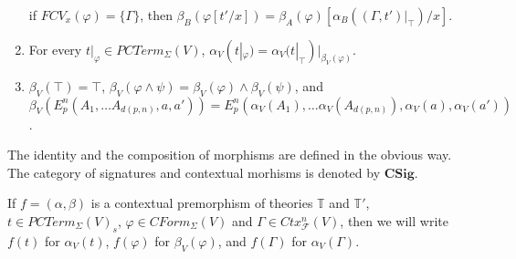 \documentclass[reqno]{amsart}
\theoremstyle{definition}
\theoremstyle{remark}
\newcommand{\cat}[1]{\mathbf{#1}}
\newcommand{\CSig}{\cat{CSig}}
\numberwithin{figure}{section}
\begin{document}
\begin{defn}
\begin{enumerate}
    if $FCV_x(\varphi) = \{ \Gamma \}$, then $\beta_B(\varphi[t'/x]) = \beta_A(\varphi)[\alpha_B((\Gamma,t')|_\top)/x]$.
\label{con-mor-b-subst}
\item For every $t|_\varphi \in PCTerm_\Sigma(V)$, $\alpha_V(t|_\varphi) = \alpha_V(t|_\top)|_{\beta_V(\varphi)}$.
\label{con-mor-a-op}
\item $\beta_V(\top) = \top$, $\beta_V(\varphi \land \psi) = \beta_V(\varphi) \land \beta_V(\psi)$,
    and $\beta_V(E^n_p(A_1, \ldots A_{d(p,n)}, a, a')) = E^n_p(\alpha_V(A_1), \ldots \alpha_V(A_{d(p,n)}), \alpha_V(a), \alpha_V(a'))$.
\label{con-mor-b-op}
\end{enumerate}
The identity and the composition of morphisms are defined in the obvious way.
The category of signatures and contextual morhisms is denoted by $\CSig$.
\end{defn}
If $f = (\alpha,\beta)$ is a contextual premorphism of theories $\mathbb{T}$ and $\mathbb{T}'$,
$t \in PCTerm_\Sigma(V)_s$, $\varphi \in CForm_\Sigma(V)$ and $\Gamma \in Ctx^n_\mathcal{F}(V)$,
then we will write $f(t)$ for $\alpha_V(t)$, $f(\varphi)$ for $\beta_V(\varphi)$, and $f(\Gamma)$ for $\alpha_V(\Gamma)$.
\end{document}
